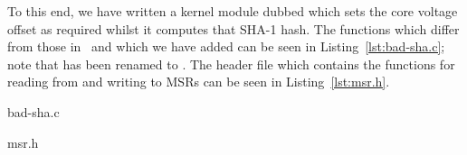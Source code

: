 To this end, we have written a kernel module dubbed  which sets
the core voltage offset as required whilst it computes that SHA-1 hash. The 
functions which differ from those in~\cite{gnupgSHA} and which we have added
can be seen in Listing~\ref{lst:bad-sha.c}; note that  has been
renamed to . The header file  which contains
the functions for reading from and writing to MSRs can be seen in
Listing~\ref{lst:msr.h}.


    {bad-sha.c}


    {msr.h}
